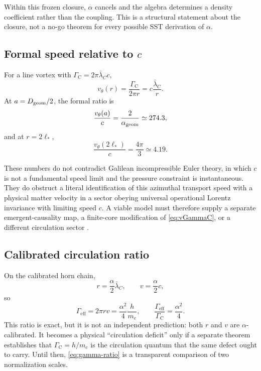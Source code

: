 \documentclass[aps,pre,preprint,notitlepage,nofootinbib,superscriptaddress]{revtex4-2}
\newcommand{\lC}{\bar\lambda_C}
\newcommand{\Gammaeff}{\Gamma_{\mathrm{eff}}}
\newcommand{\GammaC}{\Gamma_{\mathrm C}}
\begin{document}
Within this frozen closure, \(\alpha\) cancels and the algebra determines a density coefficient rather than the coupling.  This is a structural statement about the closure, not a no-go theorem for every possible SST derivation of \(\alpha\).

\subsection{\texorpdfstring{Formal speed relative to \(c\)}{Formal speed relative to c}}

For a line vortex with \(\GammaC=2\pi\lC c\),
\begin{equation}
  v_\theta(r)
  =
  \frac{\GammaC}{2\pi r}
  =
  c\frac{\lC}{r}.
  \label{eq:vGammaC}
\end{equation}
At \(a=D_{\rm geom}/2\), the formal ratio is
\[
\frac{v_\theta(a)}{c}
=
\frac{2}{\alpha_{\rm geom}}
\simeq274.3,
\]
and at \(r=2\ell_*\),
\[
\frac{v_\theta(2\ell_*)}{c}
=
\frac{4\pi}{3}
\simeq4.19.
\]

These numbers do not contradict Galilean incompressible Euler theory, in which \(c\) is not a fundamental speed limit and the pressure constraint is instantaneous.  They do obstruct a literal identification of this azimuthal transport speed with a physical matter velocity in a sector obeying universal operational Lorentz invariance with limiting speed \(c\).  A viable model must therefore supply a separate emergent-causality map, a finite-core modification of \cref{eq:vGammaC}, or a different circulation sector \cite{BarceloLiberatiVisser2026}.

\subsection{Calibrated circulation ratio}

On the calibrated horn chain,
\begin{equation}
  r=\frac{\alpha}{2}\lC,
  \qquad
  v=\frac{\alpha}{2}c,
\end{equation}
so
\begin{equation}
  \Gammaeff
  =
  2\pi rv
  =
  \frac{\alpha^2}{4}\frac{h}{m_e},
  \qquad
  \boxed{
  \frac{\Gammaeff}{\GammaC}
  =
  \frac{\alpha^2}{4}
  }.
  \label{eq:gamma-ratio}
\end{equation}
This ratio is exact, but it is not an independent prediction: both \(r\) and \(v\) are \(\alpha\)-calibrated.  It becomes a physical ``circulation deficit'' only if a separate theorem establishes that \(\GammaC=h/m_e\) is the circulation quantum that the same defect ought to carry.  Until then, \cref{eq:gamma-ratio} is a transparent comparison of two normalization scales.
\end{document}
